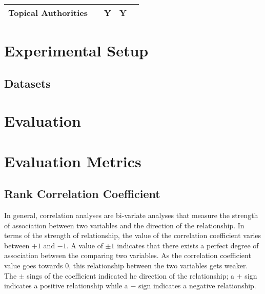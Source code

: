 \documentclass[sigconf]{acmart}
\begin{document}
\begin{table}[h]
\begin{tabular}{|l|c|l|l|l|}
		Topical Authorities                      & \multicolumn{1}{l|}{}                                               & \multicolumn{1}{c|}{Y}                                                            & \multicolumn{1}{c|}{Y}                                                             &                                           \\ \hline
	\end{tabular}
	
\end{table}

\section{Experimental Setup}

\subsection{Datasets}


\section{Evaluation}



\section{Evaluation Metrics}
\subsection{Rank Correlation Coefficient}

In general, correlation analyses are bi-variate analyses that measure the strength of association between two variables and the direction of the relationship. In terms of the strength of relationship, the value of the correlation coefficient varies between $+1$ and $-1$. A value of $\pm 1$ indicates that there exists a perfect degree of association between the comparing two variables. As the correlation coefficient value goes towards $0$, this relationship between the two variables gets weaker. The $\pm$ sings of the coefficient indicated he direction of the relationship; a $+$ sign indicates a positive relationship while a $-$ sign indicates a negative relationship.

\end{document}
